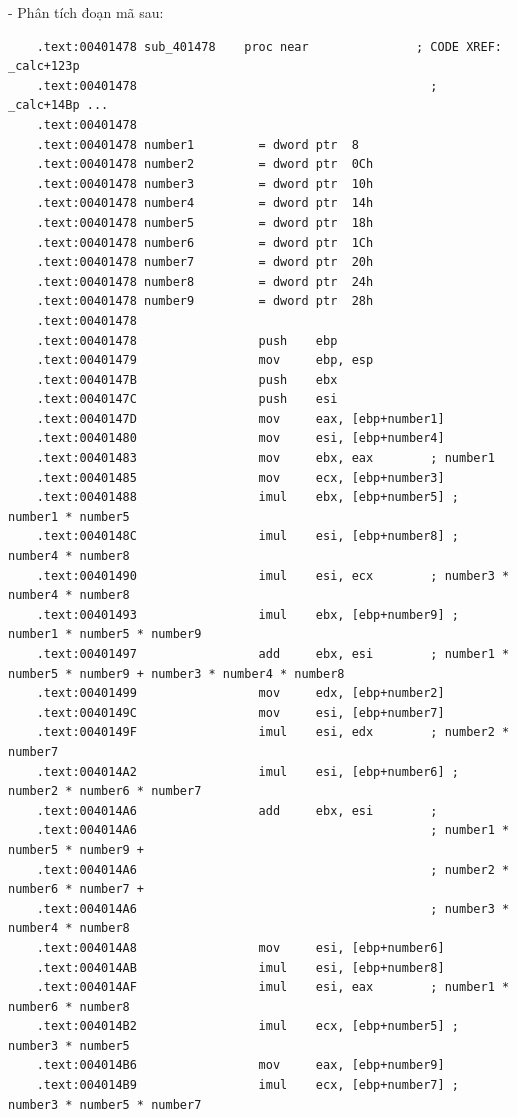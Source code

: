 - Phân tích đoạn mã sau: 
\begin{lstlisting}
	.text:00401478 sub_401478	 proc near               ; CODE XREF: _calc+123p
	.text:00401478                                         ; _calc+14Bp ...
	.text:00401478
	.text:00401478 number1         = dword ptr  8
	.text:00401478 number2         = dword ptr  0Ch
	.text:00401478 number3         = dword ptr  10h
	.text:00401478 number4         = dword ptr  14h
	.text:00401478 number5         = dword ptr  18h
	.text:00401478 number6         = dword ptr  1Ch
	.text:00401478 number7         = dword ptr  20h
	.text:00401478 number8         = dword ptr  24h
	.text:00401478 number9         = dword ptr  28h
	.text:00401478
	.text:00401478                 push    ebp
	.text:00401479                 mov     ebp, esp
	.text:0040147B                 push    ebx
	.text:0040147C                 push    esi
	.text:0040147D                 mov     eax, [ebp+number1]
	.text:00401480                 mov     esi, [ebp+number4]
	.text:00401483                 mov     ebx, eax        ; number1
	.text:00401485                 mov     ecx, [ebp+number3]
	.text:00401488                 imul    ebx, [ebp+number5] ; number1 * number5
	.text:0040148C                 imul    esi, [ebp+number8] ; number4 * number8
	.text:00401490                 imul    esi, ecx        ; number3 * number4 * number8
	.text:00401493                 imul    ebx, [ebp+number9] ; number1 * number5 * number9
	.text:00401497                 add     ebx, esi        ; number1 * number5 * number9 + number3 * number4 * number8
	.text:00401499                 mov     edx, [ebp+number2]
	.text:0040149C                 mov     esi, [ebp+number7]
	.text:0040149F                 imul    esi, edx        ; number2 * number7
	.text:004014A2                 imul    esi, [ebp+number6] ; number2 * number6 * number7
	.text:004014A6                 add     ebx, esi        ;
	.text:004014A6                                         ; number1 * number5 * number9 +
	.text:004014A6                                         ; number2 * number6 * number7 +
	.text:004014A6                                         ; number3 * number4 * number8
	.text:004014A8                 mov     esi, [ebp+number6]
	.text:004014AB                 imul    esi, [ebp+number8]
	.text:004014AF                 imul    esi, eax        ; number1 * number6 * number8
	.text:004014B2                 imul    ecx, [ebp+number5] ; number3 * number5
	.text:004014B6                 mov     eax, [ebp+number9]
	.text:004014B9                 imul    ecx, [ebp+number7] ; number3 * number5 * number7

\end{lstlisting}
